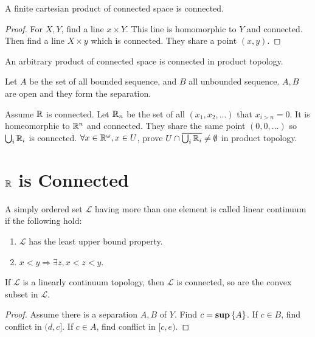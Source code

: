\begin{theorem}
A finite cartesian product of connected space is connected.
\end{theorem}
\begin{proof}
For $X,Y$, find a line $x \times Y$. This line is homomorphic to $Y$ and connected. Then find a line $X \times y$ which is connected. They share a point $(x,y)$.
\end{proof}

\begin{theorem}
    An arbitrary product of connected space is connected in product topology.    
\end{theorem}


\begin{example}
    Let $A$ be the set of all bounded sequence, and $B$ all unbounded sequence. $A,B$ are open and they form the separation.
\end{example}

\begin{example}
    Assume $\mathbb{R}$ is connected. Let $\mathbb{R}_n$ be the set of all $(x_1, x_2, ...)$ that $x_{i > n} = 0$. It is homeomorphic to $\mathbb{R}^n$ and connected. They share the same point $(0,0,...)$ so $\bigcup_i \mathbb{R}_i$ is connected. $\forall x \in \mathbb{R}^\omega, x \in U$, prove $U \cap \overline{\bigcup_i \mathbb{R}_i} \neq \emptyset$ in product topology.
\end{example}


\section{$\mathbb{R}$ is Connected}

\begin{definition}
    A simply ordered set $\mathcal{L}$ having more than one element is called linear continuum if the following hold:
    \begin{enumerate}
        \item $\mathcal{L}$ has the least upper bound property.
        \item $x < y \Rightarrow \exists z, x < z < y$.
    \end{enumerate}
\end{definition}

\begin{theorem}
    If $\mathcal{L}$ is a linearly continuum topology, then $\mathcal{L}$ is connected, so are the convex subset in $\mathcal{L}$.
\end{theorem}
\begin{proof}
    Assume there is a separation $A,B$ of $Y$. Find $c = \mathbf{sup} \set{A}$. If $c \in B$, find conflict in $(d, c]$. If $c \in A$, find conflict in $[c, e)$.
\end{proof}

